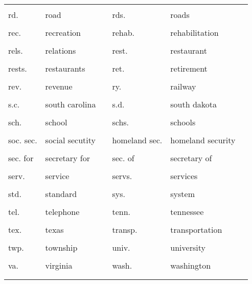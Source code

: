 \documentclass[10pt, letterpaper]{article}
\begin{document}
\begin{spacing}{1.0}
\begin{footnotesize}
\begin{longtable}[H]{p{1in}>{\raggedright}p{2in} p{0.2in} p{1in}>{\raggedright}p{2in} p{0in}}
    &  &  &  &  & \\[-6pt]
    rd. & road & & rds. & roads &\\
    &  &  &  &  & \\[-6pt]
    rec. & recreation & & rehab. & rehabilitation &\\
    &  &  &  &  & \\[-6pt]
    rels. & relations & & rest. & restaurant &\\
    &  &  &  &  & \\[-6pt]
    rests. & restaurants & & ret. & retirement &\\
    &  &  &  &  & \\[-6pt]
    rev. & revenue & & ry. & railway &\\
    &  &  &  &  & \\[-6pt]
    s.c. & south carolina & & s.d. & south dakota &\\
    &  &  &  &  & \\[-6pt]
    sch. & school & & schs. & schools &\\
    &  &  &  &  & \\[-6pt]
    soc. sec. & social secutity & & homeland sec. & homeland security &\\
    &  &  &  &  & \\[-6pt]
    sec. for & secretary for & & sec. of & secretary of &\\
    &  &  &  &  & \\[-6pt]
    serv. & service & & servs. & services &\\
    &  &  &  &  & \\[-6pt]
    std. & standard & & sys. & system &\\
    &  &  &  &  & \\[-6pt]
    tel. & telephone & & tenn. & tennessee &\\
    &  &  &  &  & \\[-6pt]
    tex. & texas & & transp. & transportation &\\
    &  &  &  &  & \\[-6pt]
    twp. & township & & univ. & university &\\
    &  &  &  &  & \\[-6pt]
    va. & virginia & & wash. & washington &\\
    \hline\\[-6pt]
    \label{tab:titleSubPhrase}
\end{longtable}
\end{footnotesize}

\clearpage


\end{spacing}
\end{document}
